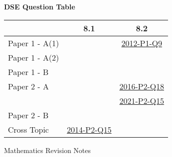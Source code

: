 \documentclass[12pt, a4paper]{article}
\begin{document}
\begin{absolutelynopagebreak}
\begin{center}
\textbf{DSE Question Table}
\end{center}
\begin{center}
\begin{tabular}{|l|c|c|}
\hline
        & 8.1 & 8.2 \\\hline
\hline
Paper 1 - A(1)&  & \hyperref[DSE2012-CoreP1-Q09]{2012-P1-Q9} \\
\hline
Paper 1 - A(2)&  &  \\
\hline
Paper 1 - B&  &  \\
\hline
\hline
Paper 2 - A&  & \hyperref[DSE2016-CoreP2-Q18]{2016-P2-Q18} \\
&  & \hyperref[DSE2021-CoreP2-Q15]{2021-P2-Q15} \\
\hline
Paper 2 - B&  &  \\
\hline
\hline
Cross Topic& \hyperref[DSE2014-CoreP2-Q15]{2014-P2-Q15} &  \\
\hline
\end{tabular}
\end{center}
\end{absolutelynopagebreak}
\newpage
\newpage
\thispagestyle{empty}
\begin{center}
Mathematics Revision Notes\\\vspace{1cm}
\\\vspace{1cm}
{\fontsize{24pt}{24pt}\selectfont {Congruence and Similarity}} \\\vspace{1cm}
\label{chapter:S1-9}

\end{center}
\vspace{0.5cm}
\hline
\end{document}
